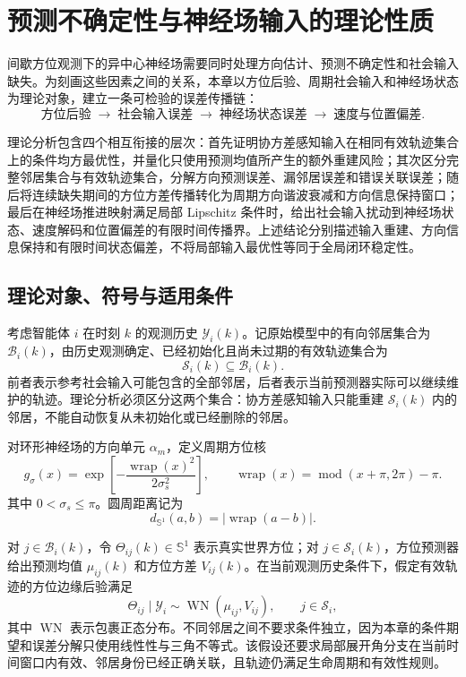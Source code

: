 \documentclass[UTF8,fontset=windows,11pt]{ctexart}
\theoremstyle{cnplain}
\numberwithin{equation}{section}
\newcommand{\Sone}{\mathbb S^1}
\begin{document}
\setcounter{section}{4}
\section{预测不确定性与神经场输入的理论性质}

间歇方位观测下的异中心神经场需要同时处理方向估计、预测不确定性和社会输入缺失。为刻画这些因素之间的关系，本章以方位后验、周期社会输入和神经场状态为理论对象，建立一条可检验的误差传播链：
\[
\text{方位后验}\;\longrightarrow\;\text{社会输入误差}\;\longrightarrow\;\text{神经场状态误差}\;\longrightarrow\;\text{速度与位置偏差}.
\]

理论分析包含四个相互衔接的层次：首先证明协方差感知输入在相同有效轨迹集合上的条件均方最优性，并量化只使用预测均值所产生的额外重建风险；其次区分完整邻居集合与有效轨迹集合，分解方向预测误差、漏邻居误差和错误关联误差；随后将连续缺失期间的方位方差传播转化为周期方向谐波衰减和方向信息保持窗口；最后在神经场推进映射满足局部 Lipschitz 条件时，给出社会输入扰动到神经场状态、速度解码和位置偏差的有限时间传播界。上述结论分别描述输入重建、方向信息保持和有限时间状态偏差，不将局部输入最优性等同于全局闭环稳定性。

\subsection{理论对象、符号与适用条件}

考虑智能体 $i$ 在时刻 $k$ 的观测历史 $\mathcal Y_i(k)$。记原始模型中的有向邻居集合为 $\mathcal B_i(k)$，由历史观测确定、已经初始化且尚未过期的有效轨迹集合为
\[
\mathcal S_i(k)\subseteq\mathcal B_i(k).
\]
前者表示参考社会输入可能包含的全部邻居，后者表示当前预测器实际可以继续维护的轨迹。理论分析必须区分这两个集合：协方差感知输入只能重建 $\mathcal S_i(k)$ 内的邻居，不能自动恢复从未初始化或已经删除的邻居。

对环形神经场的方向单元 $\alpha_m$，定义周期方位核
\begin{equation}
 g_\sigma(x)=\exp\!\left[-\frac{\operatorname{wrap}(x)^2}{2\sigma_s^2}\right],
 \qquad
 \operatorname{wrap}(x)=\operatorname{mod}(x+\pi,2\pi)-\pi .
 \label{eq:v2_kernel}
\end{equation}
其中 $0<\sigma_s\leq\pi$。圆周距离记为
\begin{equation}
 d_{\Sone}(a,b)=|\operatorname{wrap}(a-b)|.
 \label{eq:v2_circle_distance}
\end{equation}

对 $j\in\mathcal B_i(k)$，令 $\Theta_{ij}(k)\in\Sone$ 表示真实世界方位；对 $j\in\mathcal S_i(k)$，方位预测器给出预测均值 $\mu_{ij}(k)$ 和方位方差 $V_{ij}(k)$。在当前观测历史条件下，假定有效轨迹的方位边缘后验满足
\begin{equation}
 \Theta_{ij}\mid\mathcal Y_i\sim\operatorname{WN}(\mu_{ij},V_{ij}),
 \qquad j\in\mathcal S_i,
 \label{eq:v2_wn_assumption}
\end{equation}
其中 $\operatorname{WN}$ 表示包裹正态分布。不同邻居之间不要求条件独立，因为本章的条件期望和误差分解只使用线性性与三角不等式。该假设还要求局部展开角分支在当前时间窗口内有效、邻居身份已经正确关联，且轨迹仍满足生命周期和有效性规则。
\end{document}
